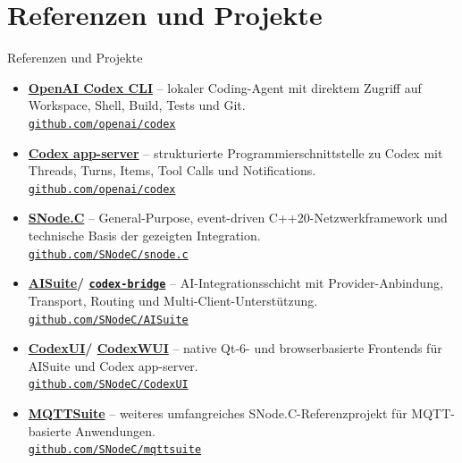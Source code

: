 \documentclass[\fhformat,10pt]{style/fh-ooe}
\newcommand{\SNodeCLink}{\href{https://github.com/SNodeC/snode.c}{SNode.C}}
\newcommand{\AISuiteLink}{\href{https://github.com/SNodeC/AISuite}{AISuite}}
\newcommand{\CodexBridgeLink}{\href{https://github.com/SNodeC/AISuite}{\texttt{codex-bridge}}}
\newcommand{\CodexUILink}{\href{https://github.com/SNodeC/CodexUI}{CodexUI}}
\newcommand{\CodexWUILink}{\href{https://github.com/SNodeC/CodexUI}{CodexWUI}}
\newcommand{\MQTTSuiteLink}{\href{https://github.com/SNodeC/mqttsuite}{MQTTSuite}}
\begin{document}
\section{Referenzen und Projekte}
\begin{frame}{Referenzen und Projekte}
\small
\begin{itemize}
  \item \textbf{\href{https://github.com/openai/codex}{OpenAI Codex CLI}} -- lokaler Coding-Agent mit direktem Zugriff auf Workspace, Shell, Build, Tests und Git.\\[-0.05em]
        \href{https://github.com/openai/codex}{\texttt{github.com/openai/codex}}
  \item \textbf{\href{https://github.com/openai/codex}{Codex app-server}} -- strukturierte Programmierschnittstelle zu Codex mit Threads, Turns, Items, Tool Calls und Notifications.\\[-0.05em]
        \href{https://github.com/openai/codex}{\texttt{github.com/openai/codex}}
  \item \textbf{\SNodeCLink} -- General-Purpose, event-driven C++20-Netzwerkframework und technische Basis der gezeigten Integration.\\[-0.05em]
        \href{https://github.com/SNodeC/snode.c}{\texttt{github.com/SNodeC/snode.c}}
  \item \textbf{\AISuiteLink / \CodexBridgeLink} -- AI-Integrationsschicht mit Provider-Anbindung, Transport, Routing und Multi-Client-Unterstützung.\\[-0.05em]
        \href{https://github.com/SNodeC/AISuite}{\texttt{github.com/SNodeC/AISuite}}
  \item \textbf{\CodexUILink / \CodexWUILink} -- native Qt-6- und browserbasierte Frontends für AISuite und Codex app-server.\\[-0.05em]
        \href{https://github.com/SNodeC/CodexUI}{\texttt{github.com/SNodeC/CodexUI}}
  \item \textbf{\MQTTSuiteLink} -- weiteres umfangreiches SNode.C-Referenzprojekt für MQTT-basierte Anwendungen.\\[-0.05em]
        \href{https://github.com/SNodeC/mqttsuite}{\texttt{github.com/SNodeC/mqttsuite}}
\end{itemize}
\end{frame}
\end{document}
